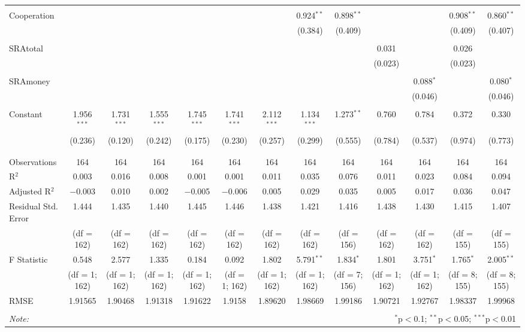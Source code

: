 \begin{table}[!htbp]
\begin{adjustbox}{width=\textwidth}
\begin{tabular}{@{\extracolsep{5pt}}lcccccccccccc}
  & & & & & & & & & & & & \\ 
 Cooperation &  &  &  &  &  &  & 0.924$^{**}$ & 0.898$^{**}$ &  &  & 0.908$^{**}$ & 0.860$^{**}$ \\ 
  &  &  &  &  &  &  & (0.384) & (0.409) &  &  & (0.409) & (0.407) \\ 
  & & & & & & & & & & & & \\ 
 SRAtotal &  &  &  &  &  &  &  &  & 0.031 &  & 0.026 &  \\ 
  &  &  &  &  &  &  &  &  & (0.023) &  & (0.023) &  \\ 
  & & & & & & & & & & & & \\ 
 SRAmoney &  &  &  &  &  &  &  &  &  & 0.088$^{*}$ &  & 0.080$^{*}$ \\ 
  &  &  &  &  &  &  &  &  &  & (0.046) &  & (0.046) \\ 
  & & & & & & & & & & & & \\ 
 Constant & 1.956$^{***}$ & 1.731$^{***}$ & 1.555$^{***}$ & 1.745$^{***}$ & 1.741$^{***}$ & 2.112$^{***}$ & 1.134$^{***}$ & 1.273$^{**}$ & 0.760 & 0.784 & 0.372 & 0.330 \\ 
  & (0.236) & (0.120) & (0.242) & (0.175) & (0.230) & (0.257) & (0.299) & (0.555) & (0.784) & (0.537) & (0.974) & (0.773) \\ 
  & & & & & & & & & & & & \\ 
\hline \\[-1.8ex] 
Observations & 164 & 164 & 164 & 164 & 164 & 164 & 164 & 164 & 164 & 164 & 164 & 164 \\ 
R$^{2}$ & 0.003 & 0.016 & 0.008 & 0.001 & 0.001 & 0.011 & 0.035 & 0.076 & 0.011 & 0.023 & 0.084 & 0.094 \\ 
Adjusted R$^{2}$ & $-$0.003 & 0.010 & 0.002 & $-$0.005 & $-$0.006 & 0.005 & 0.029 & 0.035 & 0.005 & 0.017 & 0.036 & 0.047 \\ 
Residual Std. Error & 1.444 & 1.435 & 1.440  & 1.445  & 1.446  & 1.438  & 1.421  & 1.416  & 1.438  & 1.430  & 1.415 & 1.407 \\ 
& (df = 162) & (df = 162) & (df = 162) & (df = 162)& (df = 162) & (df = 162) & (df = 162) & (df = 156) & (df = 162) & (df = 162) & (df = 155) & (df = 155) \\
F Statistic & 0.548  & 2.577 & 1.335 & 0.184  & 0.092  & 1.802  & 5.791$^{**}$  & 1.834$^{*}$  & 1.801  & 3.751$^{*}$ & 1.765$^{*}$  & 2.005$^{**}$  \\ 
& (df = 1; 162) & (df = 1; 162) & (df = 1; 162) & (df = 1; 162) & (df = 1; 162) & (df = 1; 162) & (df = 1; 162) & (df = 7; 156) & (df = 1; 162) & (df = 1; 162) & (df = 8; 155) & (df = 8; 155) \\
RMSE & 1.91565 & 1.90468 & 1.91318 & 1.91622 & 1.9158 & 1.89620 & 1.98669 & 1.99186 & 1.90721 & 1.92767 & 1.98337 & 1.99968 \\
\hline 
\hline \\[-1.8ex] 
\textit{Note:}  & \multicolumn{12}{r}{$^{*}$p$<$0.1; $^{**}$p$<$0.05; $^{***}$p$<$0.01} \\ 
\end{tabular} 
\end{adjustbox}
\end{table} 


